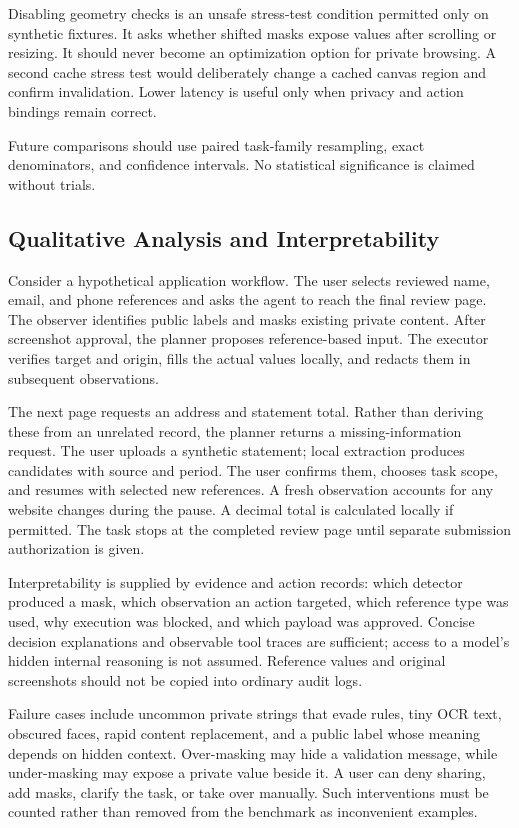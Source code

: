 \documentclass[conference]{IEEEtran}
\begin{document}
Disabling geometry checks is an unsafe stress-test condition permitted only on synthetic fixtures. It asks whether shifted masks expose values after scrolling or resizing. It should never become an optimization option for private browsing. A second cache stress test would deliberately change a cached canvas region and confirm invalidation. Lower latency is useful only when privacy and action bindings remain correct.

Future comparisons should use paired task-family resampling, exact denominators, and confidence intervals. No statistical significance is claimed without trials.

\subsection{Qualitative Analysis and Interpretability}
Consider a hypothetical application workflow. The user selects reviewed name, email, and phone references and asks the agent to reach the final review page. The observer identifies public labels and masks existing private content. After screenshot approval, the planner proposes reference-based input. The executor verifies target and origin, fills the actual values locally, and redacts them in subsequent observations.

The next page requests an address and statement total. Rather than deriving these from an unrelated record, the planner returns a missing-information request. The user uploads a synthetic statement; local extraction produces candidates with source and period. The user confirms them, chooses task scope, and resumes with selected new references. A fresh observation accounts for any website changes during the pause. A decimal total is calculated locally if permitted. The task stops at the completed review page until separate submission authorization is given.

Interpretability is supplied by evidence and action records: which detector produced a mask, which observation an action targeted, which reference type was used, why execution was blocked, and which payload was approved. Concise decision explanations and observable tool traces are sufficient; access to a model's hidden internal reasoning is not assumed. Reference values and original screenshots should not be copied into ordinary audit logs.

Failure cases include uncommon private strings that evade rules, tiny OCR text, obscured faces, rapid content replacement, and a public label whose meaning depends on hidden context. Over-masking may hide a validation message, while under-masking may expose a private value beside it. A user can deny sharing, add masks, clarify the task, or take over manually. Such interventions must be counted rather than removed from the benchmark as inconvenient examples.
\end{document}
